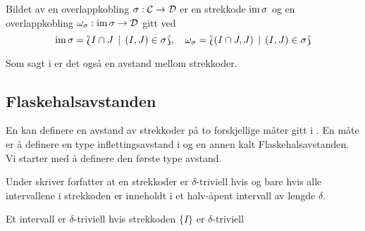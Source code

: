 \begin{teorem}\label{trm:im}
  Bildet av en overlappkobling $\sigma:\mathcal{C}\to\mathcal{D}$ er
  en strekkode $\textnormal{im}\,\sigma$ og en overlappkobling
  $\omega_\sigma:\textnormal{im}\,\sigma\to\mathcal{D}$ gitt ved
  \[\textnormal{im}\,\sigma = \Lbag I\cap J\,\mid\, (I,J)\in\sigma\Rbag,\quad
  \omega_\sigma = \Lbag (I\cap J, J)\,\mid\, (I,J)\in\sigma\Rbag\]
\end{teorem}

Som sagt i  er det også en
avstand mellom strekkoder.

\subsection{Flaskehalsavstanden}
En kan definere en avstand av strekkoder på to
forskjellige måter gitt i \cite{Bauer2018}. En måte er
å definere en type inflettingsavstand i \Barc og en annen
kalt Flaskehalsavstanden. Vi starter med å definere den
første type avstand.

\begin{bemerk}\label{bem:strek_triv}
  Under \citep[definisjon 1.3]{Bauer2018} skriver
  forfatter at en strekkoder er $\delta$-triviell hvis og
  bare hvis alle intervallene i strekkoden er inneholdt
  i et halv-åpent intervall av lengde $\delta$.
\end{bemerk}

\begin{bemerk}\label{bem:int_triv}
  Et intervall er $\delta$-triviell hvis strekkoden
  $\{I\}$ er $\delta$-triviell
\end{bemerk}

